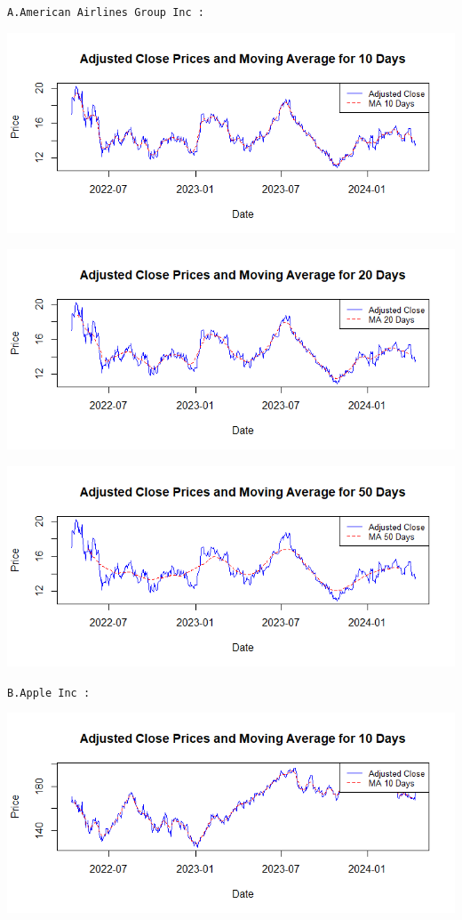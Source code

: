 \documentclass[
  letterpaper,
  DIV=11,
  numbers=noendperiod]{scrartcl}
\begin{document}
\texttt{A.American\ Airlines\ Group\ Inc\ :}

\includegraphics{images/MovingAverage10daysUS.png}

\includegraphics{images/MovingAverage20DaysUS.png}

\includegraphics{images/MovingAverage50daysUS.png}

\texttt{B.Apple\ Inc\ :}

\includegraphics{images/MovingAverage10daysApple.png}
\end{document}
